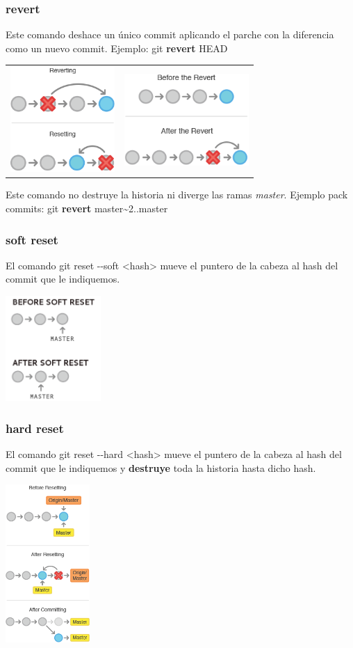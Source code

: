\frame
{
\frametitle{revert}
  Este comando deshace un único commit aplicando el parche con la diferencia como un nuevo commit. Ejemplo: git \textbf{revert} HEAD
 \begin{tabular}{p{4cm}|p{4cm}}\\
    \includegraphics[height=4cm]{imgs/revert-vs-reset.png}&
    \includegraphics[height=3.5cm]{imgs/revert-sample.png}\\
 \end{tabular}

 Este comando no destruye la historia ni diverge las ramas \textit{master}. Ejemplo pack commits: git \textbf{revert} master\textasciitilde2..master
}

\frame
{
\frametitle{soft reset}
 El comando git reset -{}-soft <hash> mueve el puntero de la cabeza al hash del commit que le indiquemos.\\
 \begin{center}
    \includegraphics[height=4cm]{imgs/soft-reset.png}
 \end{center}
}

\frame
{
\frametitle{hard reset}
 El comando git reset -{}-hard <hash> mueve el puntero de la cabeza al hash del commit que le indiquemos y \textbf{destruye} toda la historia hasta dicho hash.\\
 \begin{center}
    \includegraphics[height=6cm]{imgs/reset-hard.png}
 \end{center}
}

